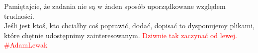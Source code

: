 \documentclass[a4paper, 10pt, ]{article}
\begin{document}
Pamiętajcie, że zadania nie są w żaden sposób uporządkowane względem trudności.\\
Jeśli jest ktoś, kto chciałby coś poprawić, dodać, dopisać to dysponujemy plikami, które chętnie udostępnimy zainteresowanym.
\newpage
\textcolor{red}{Dziwnie tak zaczynać od lewej. \#AdamLewak}
\section*{ }

\newpage




































\end{document}
